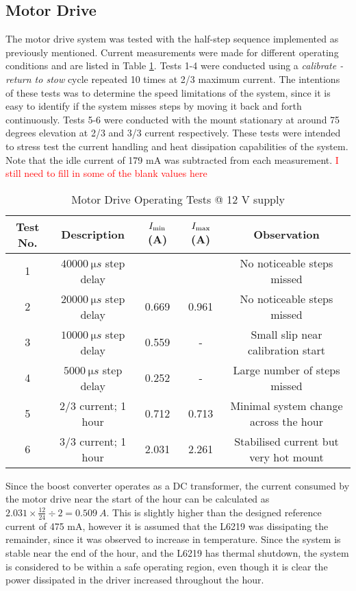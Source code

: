 \subsection{Motor Drive}
The motor drive system was tested with the half-step sequence implemented as previously mentioned. Current measurements were made for different operating conditions and are listed in Table \ref{tab:motorDriveTests}. Tests 1-4 were conducted using a \textit{calibrate - return to stow} cycle repeated 10 times at 2/3 maximum current. The intentions of these tests was to determine the speed limitations of the system, since it is easy to identify if the system misses steps by moving it back and forth continuously. Tests 5-6 were conducted with the mount stationary at around 75 degrees elevation at 2/3 and 3/3 current respectively. These tests were intended to stress test the current handling and heat dissipation capabilities of the system. Note that the idle current of 179 mA was subtracted from each measurement.
\textcolor{red}{I still need to fill in some of the blank values here}

\begin{table}[!htb]
  \centering
  \renewcommand{\arraystretch}{1.2}
  \hspace*{-1cm}
  \begin{tabular}{ |c|c|c|c|c| }
  \hline
  \textbf{Test No.}  & \textbf{Description} & \textbf{$I_{\textnormal{min}}$ (A)}   & \textbf{$I_{\textnormal{max}}$ (A)}  & Observation \\
  \hline
  1
  & $\SI{40000}{\micro s}$ step delay           
  & 
  & 
  & No noticeable steps missed
  \\  \hline
  2
  & $\SI{20000}{\micro s}$ step delay           
  & 0.669
  & 0.961
  & No noticeable steps missed
  \\  \hline
  3
  & $\SI{10000}{\micro s}$ step delay           
  & 0.559
  & -                   
  & Small slip near calibration start
  \\  \hline
  4
  & $\SI{5000}{\micro s}$ step delay           
  & 0.252
  & -                   
  & Large number of steps missed
  \\  \hline
  5
  & 2/3 current; 1 hour
  & 0.712
  & 0.713
  & Minimal system change across the hour
  \\  \hline
  6
  & 3/3 current; 1 hour
  & 2.031
  & 2.261
  & Stabilised current but very hot mount
  \\  \hline
  \end{tabular}
  \caption{Motor Drive Operating Tests @ 12 V supply}
  \label{tab:motorDriveTests}
\end{table}

Since the boost converter operates as a DC transformer, the current consumed by the motor drive near the start of the hour can be calculated as $2.031 \times \frac{12}{24} \div 2 = \SI{0.509}{A}$. This is slightly higher than the designed reference current of 475 mA, however it is assumed that the L6219 was dissipating the remainder, since it was observed to increase in temperature. Since the system is stable near the end of the hour, and the L6219 has thermal shutdown, the system is considered to be within a safe operating region, even though it is clear the power dissipated in the driver increased throughout the hour.